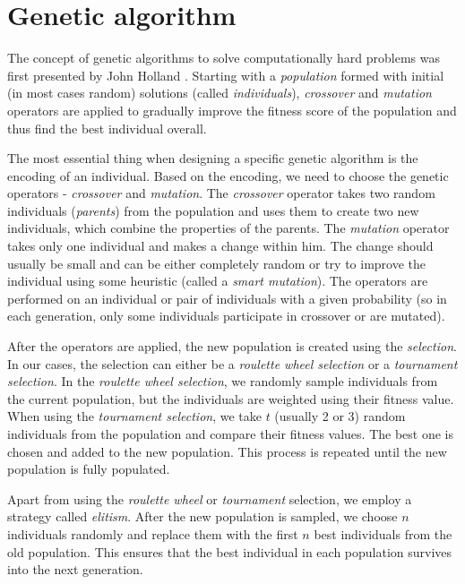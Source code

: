 \chapter{Genetic algorithm}

The concept of genetic algorithms to solve computationally hard problems was first presented by John Holland \cite{Holland:1975}. Starting with a \textit{population} formed with initial (in most cases random) solutions (called \textit{individuals}), \textit{crossover} and \textit{mutation} operators are applied to gradually improve the fitness score of the population and thus find the best individual overall.

The most essential thing when designing a specific genetic algorithm is the encoding of an individual. Based on the encoding, we need to choose the genetic operators - \textit{crossover} and \textit{mutation}. The \textit{crossover} operator takes two random individuals (\textit{parents}) from the population and uses them to create two new individuals, which combine the properties of the parents. The \textit{mutation} operator takes only one individual and makes a change within him. The change should usually be small and can be either completely random or try to improve the individual using some heuristic (called a \textit{smart mutation}). The operators are performed on an individual or pair of individuals with a given probability (so in each generation, only some individuals participate in crossover or are mutated).

After the operators are applied, the new population is created using the \textit{selection}. In our cases, the selection can either be a \textit{roulette wheel selection} or a \textit{tournament selection}. In the \textit{roulette wheel selection}, we randomly sample individuals from the current population, but the individuals are weighted using their fitness value. When using the \textit{tournament selection}, we take $t$ (usually 2 or 3) random individuals from the population and compare their fitness values. The best one is chosen and added to the new population. This process is repeated until the new population is fully populated.

Apart from using the \textit{roulette wheel} or \textit{tournament} selection, we employ a strategy called \textit{elitism}. After the new population is sampled, we choose $n$ individuals randomly and replace them with the first $n$ best individuals from the old population. This ensures that the best individual in each population survives into the next generation.

